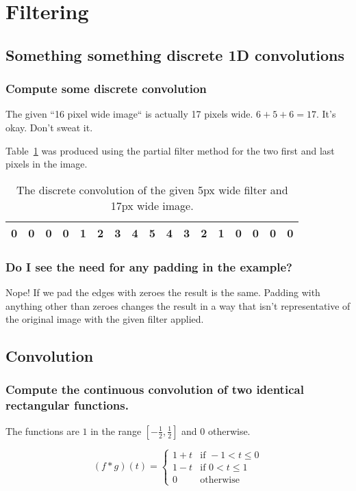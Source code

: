 \section{Filtering}
\subsection{Something something discrete 1D convolutions}

\subsubsection{Compute some discrete convolution}
The given ``16 pixel wide image`` is actually 17 pixels wide.
$6+5+6 = 17$.
It's okay.
Don't sweat it.

Table~\ref{tab:11a} was produced using the partial filter method for the two first and last pixels in the image.

\begin{table}[H]
\centering
\begin{tabular}{|c|c|c|c|c|c|c|c|c|c|c|c|c|c|c|c|c|}
    \hline
    0 & 0 & 0 & 0 & 1 & 2 & 3 & 4 & 5 & 4 & 3 & 2 & 1 & 0 & 0 & 0 & 0 \\
    \hline
\end{tabular}
\caption{The discrete convolution of the given 5px wide filter and 17px wide image.}
\label{tab:11a}
\end{table}


\subsubsection{Do I see the need for any padding in the example?}
Nope!
If we pad the edges with zeroes the result is the same.
Padding with anything other than zeroes changes the result in a way that isn't representative of the original image with the given filter applied.

\subsection{Convolution}

\subsubsection{Compute the continuous convolution of two identical rectangular functions.}
The functions are $1$ in the range $[-\frac{1}{2}, \frac{1}{2}]$ and $0$ otherwise.

$$
(f * g)(t) =
\begin{cases}
    1+t & \text{if } -1 < t \leq 0 \\
    1-t & \text{if } 0 < t \leq 1 \\
    0 & \text{otherwise}
\end{cases}
$$

